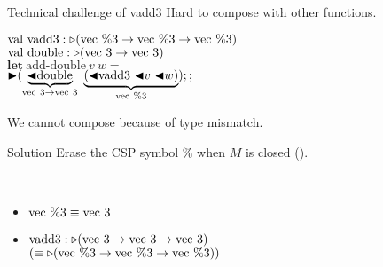 \documentclass[dvipdfmx,aspectratio=169, 20pt]{beamer}
\renewcommand{\V}{\vdash}
\begin{document}
\begin{frame}[fragile]{Technical challenge of vadd3}
    Hard to compose with other functions.
    \newcommand{\Vn}{\text{vec}\ \%n}
    \newcommand{\Vpt}{\text{vec}\ \%3}
    \newcommand{\Vt}{\text{vec}\ 3}
    \begin{exampleblock}{}
    \begin{tabbing}
        \hspace{5mm} \= \( \text{val}\ \text{vadd3} : \TW (\Vpt \to \Vpt \to \Vpt) \) \\
        \> \( \text{val}\ \text{double} : \TW (\Vt \to \Vt) \) \\[2mm]
        \> \( \textbf{let}\ \text{add-double}\ v\ w = \) \\
        \> \hspace{5mm} \( \TB (\underbrace{\TBL\text{double}}_{\Vt \to \Vt}\ \underbrace{(\TBL \text{vadd3}\ \TBL v\ \TBL w)}_{\Vpt});; \) \\
    \end{tabbing}
    \end{exampleblock}
    We cannot compose because of type mismatch.
\end{frame}

\begin{frame}[fragile]{Solution}
    \newcommand{\Vt}{\text{vec}\ 3}
    \newcommand{\Vpt}{\text{vec}\ \%3}
    Erase the CSP symbol \( \% \) when \(M \) is closed (\QPercent).
    {\footnotesize{
    \begin{center}
         \\[2mm]
        \infrule[{\TConv}]{
            \G\V M:\tau@n \andalso
            \G\V \tau\equiv \sigma @n
        }{
            \G\V M:\sigma@n
        }
    \end{center}
    }}
    \begin{exampleblock}{}
        \begin{itemize}
            \item \( \text{vec}\ \%3 \equiv \text{vec}\ 3 \)
            \item \( \text{vadd3} : \TW (\Vt \to \Vt \to \Vt) \) \\
                \hspace{15mm} \( (\E  \TW (\Vpt \to \Vpt \to \Vpt)) \)
        \end{itemize}
    \end{exampleblock}
\end{frame}
\end{document}
